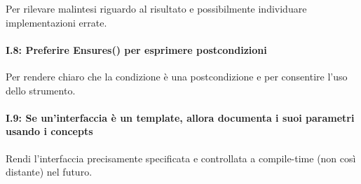\textsf{\small Per rilevare malintesi riguardo al risultato e possibilmente individuare implementazioni errate.} \\

\paragraph{I.8: Preferire \textbf{Ensures()} per esprimere postcondizioni}

\textsf{\small Per rendere chiaro che la condizione è una postcondizione e per consentire l'uso dello strumento.} \\ %

\paragraph{I.9: Se un'interfaccia è un template, allora documenta i suoi parametri usando i concepts}

\textsf{\small Rendi l'interfaccia precisamente specificata e controllata a compile-time (non così distante) nel futuro.} \\

